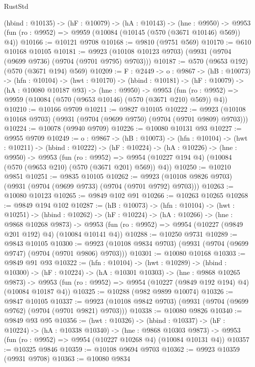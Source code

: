 \begin{lexlean}{RustStd}
\begin{coremodule}
  (hbind : @10135) ->
  (hF : @10079) ->
  (hA : @10143) ->
  (hne : @9950) -> @9953 (fun (ro : @9952) => @9959 (@10084 (@10145 (@570 (@3671 @10146) @569)) @4))
@10166 := @10121 @9708
@10168 := @9810 (@9751 @569)
@10170 := @610 @10168 @10105
@10181 := @9923 (@10108 @10123 @9703) (@9931 (@9704 (@9699 @9736) (@9704 (@9701 @9795) @9703)))
@10187 := @570 (@9653 @192) (@570 (@3671 @194) @569)
@10209 := {F : @2449} ->
  {o : @9867} ->
  (hB : @10073) ->
  (hfn : @10104) ->
  (hwt : @10170) ->
  (hbind : @10181) ->
  (hF : @10079) ->
  (hA : @10080 @10187 @93) ->
  (hne : @9950) ->
  @9953 (fun (ro : @9952) => @9959 (@10084 (@570 (@9653 @10146) (@570 (@3671 @210) @569)) @4))
@10210 := @10166 @9709
@10211 := @9827 @10105
@10222 := @9923 (@10108 @10168 @9703) (@9931 (@9704 (@9699 @9750) (@9704 (@9701 @9809) @9703)))
@10224 := @10078 (@9940 @9709)
@10226 := @10080 @10131 @93
@10227 := @9955 @9709
@10249 := {o : @9867} ->
  (hB : @10073) ->
  (hfn : @10104) ->
  (hwt : @10211) ->
  (hbind : @10222) ->
  (hF : @10224) ->
  (hA : @10226) ->
  (hne : @9950) ->
  @9953
    (fun (ro : @9952) =>
    @9954 (@10227 @194 @4) (@10084 (@570 (@9653 @210) (@570 (@3671 @201) @569)) @4))
@10250 := @10210 @9851
@10251 := @9835 @10105
@10262 := @9923 (@10108 @9826 @9703) (@9931 (@9704 (@9699 @9733) (@9704 (@9701 @9792) @9703)))
@10263 := @10080 @10123
@10265 := @9849 @102 @91
@10266 := @10263 @10265
@10268 := @9849 @194 @102
@10287 := (hB : @10073) ->
  (hfn : @10104) ->
  (hwt : @10251) ->
  (hbind : @10262) ->
  (hF : @10224) ->
  (hA : @10266) ->
  (hne : @9868 @10268 @9873) ->
  @9953 (fun (ro : @9952) => @9954 (@10227 (@9849 @201 @192) @4) (@10084 @10141 @4))
@10288 := @10250 @9731
@10289 := @9843 @10105
@10300 := @9923 (@10108 @9834 @9703) (@9931 (@9704 (@9699 @9747) (@9704 (@9701 @9806) @9703)))
@10301 := @10080 @10168
@10303 := @9849 @91 @93
@10322 := (hfn : @10104) ->
  (hwt : @10289) ->
  (hbind : @10300) ->
  (hF : @10224) ->
  (hA : @10301 @10303) ->
  (hne : @9868 @10265 @9873) ->
  @9953 (fun (ro : @9952) => @9954 (@10227 (@9849 @192 @194) @4) (@10084 @10187 @4))
@10325 := @10288 (@982 @9899 @10074)
@10326 := @9847 @10105
@10337 := @9923 (@10108 @9842 @9703) (@9931 (@9704 (@9699 @9762) (@9704 (@9701 @9821) @9703)))
@10338 := @10080 @9826
@10340 := @9849 @93 @95
@10356 := (hwt : @10326) ->
  (hbind : @10337) ->
  (hF : @10224) ->
  (hA : @10338 @10340) ->
  (hne : @9868 @10303 @9873) ->
  @9953 (fun (ro : @9952) => @9954 (@10227 @10268 @4) (@10084 @10131 @4))
@10357 := @10325 @9846
@10359 := @10108 @9694 @9703
@10362 := @9923 @10359 (@9931 @9708)
@10363 := @10080 @9834

\end{coremodule}
\end{lexlean}
